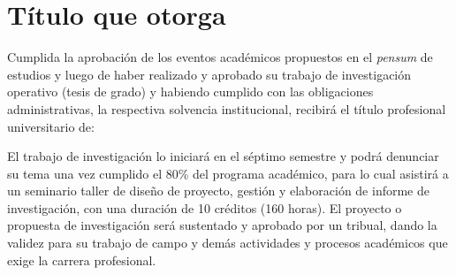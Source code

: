 \section{Título que otorga}\label{sec:cs-grados-y-titulos}
Cumplida la aprobación de los eventos académicos propuestos en el \textit{pensum} 
de estudios y luego de haber realizado y aprobado su trabajo de investigación 
operativo (tesis de grado) y habiendo cumplido con las obligaciones 
administrativas, la respectiva solvencia  institucional, 
recibirá el título profesional universitario de:

\GradosyTitulos

El trabajo de investigación lo iniciará en el séptimo semestre y podrá 
denunciar su tema una vez cumplido el 80\% del programa académico, 
para  lo cual asistirá a un seminario taller de diseño de proyecto, 
gestión y elaboración de informe de investigación, con una duración de 
10 créditos (160 horas). El proyecto o propuesta de investigación 
será sustentado y aprobado por un tribual, dando la validez para su 
trabajo de campo y demás actividades y procesos académicos que exige 
la carrera profesional. 
